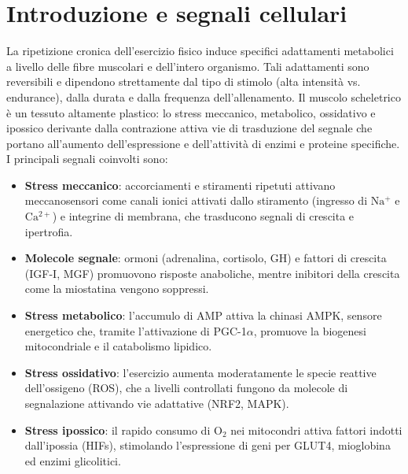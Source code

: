 \documentclass[12pt,a4paper]{report}
\begin{document}
\section{Introduzione e segnali cellulari}
La ripetizione cronica dell'esercizio fisico induce specifici adattamenti metabolici a livello delle fibre muscolari e dell'intero organismo. Tali adattamenti sono reversibili e dipendono strettamente dal tipo di stimolo (alta intensità vs. endurance), dalla durata e dalla frequenza dell'allenamento.
Il muscolo scheletrico è un tessuto altamente plastico: lo stress meccanico, metabolico, ossidativo e ipossico derivante dalla contrazione attiva vie di trasduzione del segnale che portano all'aumento dell'espressione e dell'attività di enzimi e proteine specifiche. I principali segnali coinvolti sono:
\begin{itemize}
\item \textbf{Stress meccanico}: accorciamenti e stiramenti ripetuti attivano meccanosensori come canali ionici attivati dallo stiramento (ingresso di \(\mathrm{Na^+}\) e \(\mathrm{Ca^{2+}}\)) e integrine di membrana, che trasducono segnali di crescita e ipertrofia.
\item \textbf{Molecole segnale}: ormoni (adrenalina, cortisolo, GH) e fattori di crescita (IGF-I, MGF) promuovono risposte anaboliche, mentre inibitori della crescita come la miostatina vengono soppressi.
\item \textbf{Stress metabolico}: l'accumulo di AMP attiva la chinasi AMPK, sensore energetico che, tramite l'attivazione di PGC-1\(\alpha\), promuove la biogenesi mitocondriale e il catabolismo lipidico.
\item \textbf{Stress ossidativo}: l'esercizio aumenta moderatamente le specie reattive dell'ossigeno (ROS), che a livelli controllati fungono da molecole di segnalazione attivando vie adattative (NRF2, MAPK).
\item \textbf{Stress ipossico}: il rapido consumo di \(\mathrm{O_2}\) nei mitocondri attiva fattori indotti dall'ipossia (HIFs), stimolando l'espressione di geni per GLUT4, mioglobina ed enzimi glicolitici.
\end{itemize}
\end{document}
